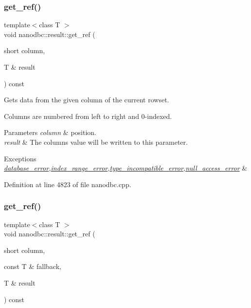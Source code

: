 \subsubsection{\texorpdfstring{get\_ref()}{get\_ref()}\hspace{0.1cm}{\footnotesize\ttfamily [1/4]}}
{\footnotesize\ttfamily template$<$class T $>$ \\
void nanodbc\+::result\+::get\+\_\+ref (\begin{DoxyParamCaption}\item[{short}]{column,  }\item[{T \&}]{result }\end{DoxyParamCaption}) const}



Gets data from the given column of the current rowset. 

Columns are numbered from left to right and 0-\/indexed. 
\begin{DoxyParams}{Parameters}
{\em column} & position. \\
\hline
{\em result} & The column\textquotesingle{}s value will be written to this parameter. \\
\hline
\end{DoxyParams}

\begin{DoxyExceptions}{Exceptions}
{\em \mbox{\hyperlink{classnanodbc_1_1database__error}{database\+\_\+error}},\mbox{\hyperlink{classnanodbc_1_1index__range__error}{index\+\_\+range\+\_\+error}},\mbox{\hyperlink{classnanodbc_1_1type__incompatible__error}{type\+\_\+incompatible\+\_\+error}},\mbox{\hyperlink{classnanodbc_1_1null__access__error}{null\+\_\+access\+\_\+error}}} & \\
\hline
\end{DoxyExceptions}


Definition at line 4823 of file nanodbc.\+cpp.

\mbox{\label{classnanodbc_1_1result_a5f1ed8303dd506ed57a3eb87acd219b1}} 
\subsubsection{\texorpdfstring{get\_ref()}{get\_ref()}\hspace{0.1cm}{\footnotesize\ttfamily [2/4]}}
{\footnotesize\ttfamily template$<$class T $>$ \\
void nanodbc\+::result\+::get\+\_\+ref (\begin{DoxyParamCaption}\item[{short}]{column,  }\item[{const T \&}]{fallback,  }\item[{T \&}]{result }\end{DoxyParamCaption}) const}



